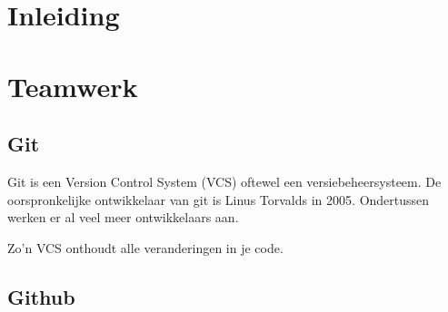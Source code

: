 \section{Inleiding}

\section{Teamwerk}
\subsection{Git}
Git is een Version Control System (VCS) oftewel een versiebeheersysteem. De oorspronkelijke ontwikkelaar van git is Linus Torvalds in 2005.\cite{init_git} Ondertussen werken er al veel meer ontwikkelaars aan. 

Zo'n VCS onthoudt alle veranderingen in je code.
\subsection{Github}